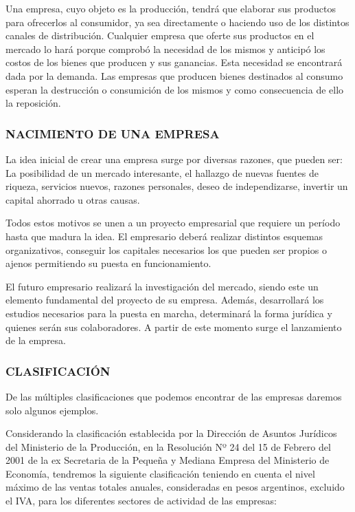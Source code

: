 Una empresa, cuyo objeto es la producción, tendrá que elaborar sus productos para ofrecerlos al consumidor, ya sea directamente o haciendo uso de los distintos canales de distribución. Cualquier empresa que oferte sus productos en el mercado lo hará porque comprobó la necesidad de los mismos y anticipó los costos de los bienes que producen y sus ganancias. Esta necesidad se encontrará dada por la demanda. Las empresas que producen bienes destinados al consumo esperan la destrucción o consumición de los mismos y como consecuencia de ello la reposición.



\subsubsection*{NACIMIENTO DE UNA EMPRESA}
La idea inicial de crear una empresa surge por diversas razones, que pueden ser: La posibilidad de un mercado interesante, el hallazgo de nuevas fuentes de riqueza, servicios nuevos, razones personales, deseo de independizarse, invertir un capital ahorrado u otras causas.

Todos estos motivos se unen a un proyecto empresarial que requiere un período hasta que madura la idea. El empresario deberá realizar distintos esquemas organizativos, conseguir los capitales necesarios los que pueden ser propios o ajenos permitiendo su puesta en funcionamiento.

El futuro empresario realizará la investigación del mercado, siendo este un elemento fundamental del proyecto de su empresa. Además, desarrollará los estudios necesarios para la puesta en marcha, determinará la forma jurídica y quienes serán sus colaboradores. A partir de este momento surge el lanzamiento de la empresa.

\subsubsection*{CLASIFICACIÓN}
De las múltiples clasificaciones que podemos encontrar de las empresas daremos solo algunos ejemplos.

Considerando la clasificación establecida por la Dirección de Asuntos Jurídicos del Ministerio de la Producción, en la Resolución Nº 24 del 15 de Febrero del 2001 de la ex Secretaria de la Pequeña y Mediana Empresa del Ministerio de Economía, tendremos la siguiente clasificación teniendo en cuenta el nivel máximo de las ventas totales anuales, consideradas en pesos argentinos, excluido el IVA, para los diferentes sectores de actividad de las empresas:


